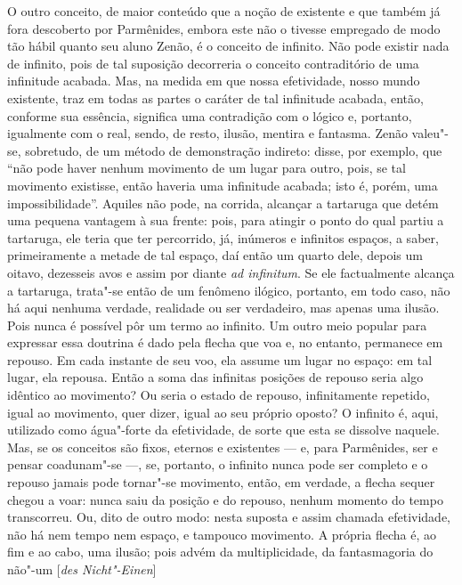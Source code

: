 O outro conceito, de maior conteúdo que a noção de existente e que também já
fora descoberto por Parmênides, embora este não o tivesse empregado de modo
tão hábil quanto seu aluno Zenão, é o conceito de infinito. Não pode existir
nada de infinito, pois de tal suposição decorreria o conceito contraditório
de uma infinitude acabada. Mas, na medida em que nossa efetividade, nosso
mundo existente, traz em todas as partes o caráter de tal infinitude acabada,
então, conforme sua essência, significa uma contradição com o lógico e,
portanto, igualmente com o real, sendo, de resto, ilusão, mentira e fantasma.
Zenão valeu"-se, sobretudo, de um método de demonstração indireto: \label{zenaovaleuse} 
disse, por exemplo, que ``não pode haver nenhum movimento de
um lugar para outro, pois, se tal movimento existisse, então haveria uma
infinitude acabada; isto é, porém, uma impossibilidade''. Aquiles não pode,
na corrida, alcançar a tartaruga que detém uma pequena vantagem à sua frente:
pois, para atingir o ponto do qual partiu a tartaruga, ele teria que ter
percorrido, já, inúmeros e infinitos espaços, a saber, primeiramente a metade
de tal espaço, daí então um quarto dele, depois um oitavo, dezesseis avos e
assim por diante \textit{ad infinitum}. Se ele factualmente alcança a
tartaruga, trata"-se então de um fenômeno ilógico, portanto, em todo caso,
não há aqui nenhuma verdade, realidade ou ser verdadeiro, mas apenas uma
ilusão. Pois nunca é possível pôr um termo ao infinito. Um outro meio popular
para expressar essa doutrina é dado pela flecha que voa e, no entanto,
permanece em repouso. Em cada instante de seu voo, ela assume um lugar no
espaço: em tal lugar, ela repousa. Então a soma das infinitas posições de
repouso seria algo idêntico ao movimento? Ou seria o estado de repouso,
infinitamente repetido, igual ao movimento, quer dizer, igual ao seu próprio
oposto? O infinito é, aqui, utilizado como água"-forte da efetividade, de
sorte que esta se dissolve naquele. Mas, se os conceitos são fixos, eternos e
existentes --- e, para Parmênides, ser e pensar coadunam"-se ---, se, portanto,
o infinito nunca pode ser completo e o repouso jamais pode tornar"-se
movimento, então, em verdade, a flecha sequer chegou a voar: nunca saiu da
posição e do repouso, nenhum momento do tempo transcorreu. Ou, dito de outro
modo: nesta suposta e assim chamada efetividade, não há nem tempo nem espaço,
e tampouco movimento. A própria flecha é, ao fim e ao cabo, uma ilusão; pois
advém da multiplicidade, da fantasmagoria do não"-um [\textit{des Nicht"-Einen}] 
